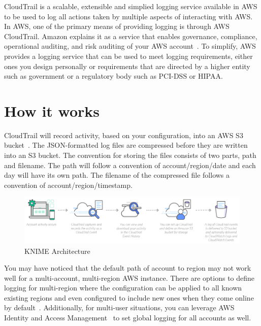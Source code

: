 CloudTrail is a scalable, extensible and simplied logging service available 
in AWS to be used to log all actions taken by multiple aspects of interacting
with AWS. In AWS, one of the primary means of providing logging is through AWS 
CloudTrail. Amazon explains it as a service that enables governance, 
compliance, operational auditing, and risk auditing of your AWS 
account~\cite{hid-sp18-518-CloudTrail-user-guide}. To simplify, AWS provides 
a logging service that can be used to meet logging requirements, either ones
you design personally or requirements that are directed by a higher entity 
such as government or a regulatory body such as PCI-DSS or HIPAA.

\section{How it works}

CloudTrail will record activity, based on your configuration, into an 
AWS S3 bucket~\cite{hid-sp18-518-CloudTrail-log-example}.
The JSON-formatted log files are compressed before they are written into an 
S3 bucket. The convention for storing the files consists of two 
parts, path and filename. The path will follow a convention of 
account/region/date and each day will have its own path.  The filename of the 
compressed file follows a convention of account/region/timestamp. 

\begin{figure}[!ht]
	\centering\includegraphics[width=\columnwidth]{../images/Cloudtrail-How-it-works.png}
	\caption{KNIME Architecture~\cite{hid-sp18-518-CloudTrail-CloudFormation-Image}}
 	\label{fig:CloudTrail}
\end{figure}

You may have noticed that the default path of account to region may not work 
well for a multi-account, multi-region AWS instance. There are options to 
define logging for multi-region where the configuration can be applied to all 
known existing regions and even configured to include new ones when they come 
online by default~\cite{hid-sp18-518-CloudTrail-global-events}. Additionally, 
for multi-user situations, you can leverage AWS Identity and Access 
Management~\cite{hid-sp18-518-CloudTrail-IAM} to set global logging for all 
accounts as well.

